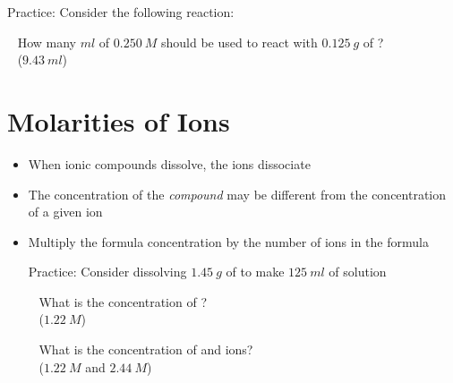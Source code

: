 \documentclass[12pt, openany, letterpaper]{memoir}
\begin{document}
\begin{itemize}
	      Practice: Consider the following reaction: 

	      ~\hphantom{Practice:} How many $ml$ of $0.250~M$ should be used to react with $0.125~g$ of ?\\
	      ~\hphantom{Practice: } ($9.43~ml$)
\end{itemize}
\section{Molarities of Ions}
\begin{itemize}
	\item When ionic compounds dissolve, the ions dissociate
	\item The concentration of the \emph{compound} may be different from the concentration of a given ion
	\item Multiply the formula concentration by the number of ions in the formula

	      Practice: Consider dissolving $1.45~g$ of  to make $125~ml$ of solution

	      ~\hphantom{Practice:} What is the concentration of ?\\
	      ~\hphantom{Practice: } ($1.22~M$)

	      ~\hphantom{Practice:} What is the concentration of  and  ions?\\
	      ~\hphantom{Practice: } ($1.22~M$ and $2.44~M$)
\end{itemize}
\end{document}
